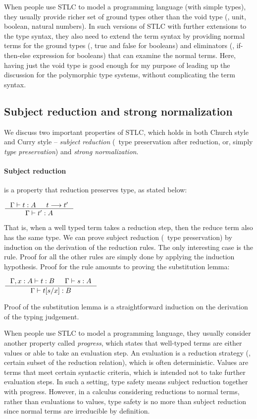 When people use STLC to model a programming language (with simple types),
they usually provide richer set of ground types other than the void type
(\eg, unit, boolean, natural numbers). In such versions of STLC with further
extensions to the type syntax, they also need to extend the term syntax
by providing normal terms for the ground types (\eg, \textsf{true} and
\textsf{false} for booleans) and eliminators (\eg, if-then-else expression for
booleans) that can examine the normal terms. Here, having just the void type
is good enough for my purpose of leading up the discussion for
the polymorphic type systems, without complicating the term syntax.

\subsection{Subject reduction and strong normalization}\label{sec:stlc:srsn}
We discuss two important properties of STLC, which holds in both
Church style and Curry style --
\emph{subject reduction} (\aka\ type preservation after reduction, or,
simply \emph{type preservation}) and \emph{strong normalization}.

\paragraph{Subject reduction} is a property that reduction preserves type,
as stated below:
\begin{theorem}
	$\inference{\Gamma |- t : A  & t --> t'}{\Gamma |- t' : A}$
\end{theorem}
That is, when a well typed term takes a reduction step, then the reduce term
also has the same type. We can prove subject reduction (\aka\ type preservation)
by induction on the derivation of the reduction rules.
The only interesting case is the  rule. Proof for all
the other rules are simply done by applying the induction hypothesis.
Proof for the  rule amounts to proving the substitution lemma:
\begin{lemma}[substitution]
$ \inference{\Gamma,x:A |- t : B  & \Gamma |- s : A}{\Gamma |- t[s/x] : B} $
\end{lemma}
Proof of the substitution lemma is a straightforward induction on
the derivation of the typing judgement.

When people use STLC to model a programming language,
they usually consider another property called \emph{progress},
which states that well-typed terms are either values or
able to take an evaluation step. An evaluation is a reduction strategy
(\ie, certain subset of the reduction relation), which is often deterministic.
Values are terms that meet certain syntactic criteria, which is intended not
to take further evaluation steps. In such a setting, type safety means
subject reduction together with progress. However, in a calculus considering
reductions to normal terms, rather than evaluations to values, type safety is
no more than subject reduction since normal terms are irreducible by definition.

